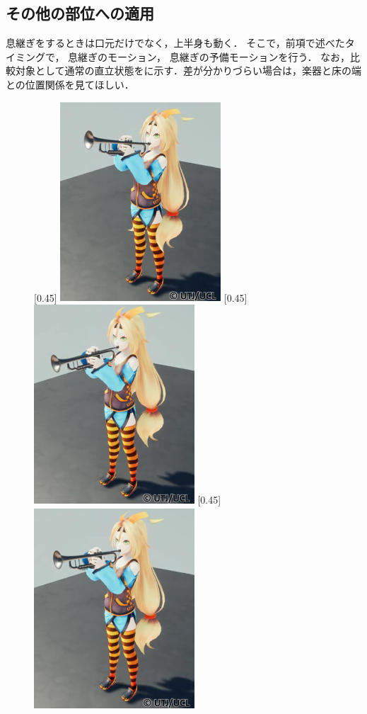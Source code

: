 \subsection{その他の部位への適用}
\indent
息継ぎをするときは口元だけでなく，上半身も動く．
そこで，前項で述べたタイミングで，
息継ぎのモーション，
息継ぎの予備モーションを行う．
なお，比較対象として通常の直立状態をに示す．差が分かりづらい場合は，楽器と床の端との位置関係を見てほしい．\\
\begin{figure}[!h]
	\centering
	[0.45\linewidth]{
		\includegraphics[width=6cm]{fig/chap3/up.eps}}
	[0.45\linewidth]{
		\includegraphics[width=6cm]{fig/chap3/down.eps}}
	[0.45\linewidth]{
		\includegraphics[width=6cm]{fig/chap3/default.eps}}

\end{figure}
